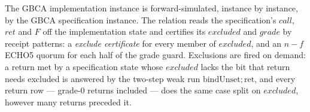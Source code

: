 \begin{theorem}
  \label{thm:gbca-implementation-refines-specification}
  \leanok
  The GBCA implementation instance is forward-simulated, instance by instance, by the GBCA specification instance.
  The relation reads the specification's $call$, $ret$ and $F$ off the implementation state and certifies its $excluded$ and $grade$ by receipt patterns: a \emph{exclude certificate} for every member of $excluded$, and an $n{-}f$ ECHO5 quorum for each half of the grade guard.
  Exclusions are fired on demand: a return met by a specification state whose $excluded$ lacks the bit that return needs excluded is answered by the two-step weak run $\mathrm{bindUnset};\mathrm{ret}$, and every return row --- grade-0 returns included --- does the same case split on $excluded$, however many returns preceded it.
\end{theorem}

